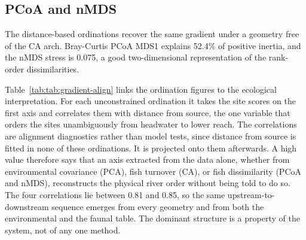 \documentclass[11pt]{article}
\begin{document}
\subsection{PCoA and nMDS}
The distance-based ordinations recover the same gradient under a geometry free of the CA arch. Bray-Curtis PCoA MDS1 explains 52.4\% of positive inertia, and the nMDS stress is 0.075, a good two-dimensional representation of the rank-order dissimilarities.
\begin{table}[!h]
\centering
\caption{\label{tab:tab:pcoa-eig}PCoA positive eigenvalues for Bray-Curtis fish dissimilarities. Percentages are relative to the sum of positive eigenvalues.}
\centering
{}
\end{table}
Table~\ref{tab:tab:gradient-align} links the ordination figures to the ecological interpretation. For each unconstrained ordination it takes the site scores on the first axis and correlates them with distance from source, the one variable that orders the sites unambiguously from headwater to lower reach. The correlations are alignment diagnostics rather than model tests, since distance from source is fitted in none of these ordinations. It is projected onto them afterwards. A high value therefore says that an axis extracted from the data alone, whether from environmental covariance (PCA), fish turnover (CA), or fish dissimilarity (PCoA and nMDS), reconstructs the physical river order without being told to do so. The four correlations lie between 0.81 and 0.85, so the same upstream-to-downstream sequence emerges from every geometry and from both the environmental and the faunal table. The dominant structure is a property of the system, not of any one method.
\begin{table}[!h]
\centering
\caption{\label{tab:tab:gradient-align}Alignment between first ordination axes and the longitudinal river gradient.}
\centering
{}
\end{table}
\end{document}
